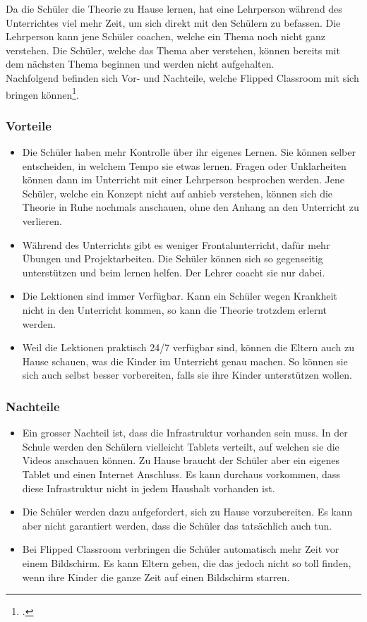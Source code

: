 Da die Schüler die Theorie zu Hause lernen, hat eine Lehrperson während des Unterrichtes viel mehr Zeit, um sich direkt mit den Schülern zu befassen. Die Lehrperson kann jene Schüler coachen, welche ein Thema noch nicht ganz verstehen. Die Schüler, welche das Thema aber verstehen, können bereits mit dem nächsten Thema beginnen und werden nicht aufgehalten. \\

Nachfolgend befinden sich Vor- und Nachteile, welche Flipped Classroom mit sich bringen können\footcite{flipped_classroom_pro_con}.

\subsubsection*{Vorteile}
\begin{itemize}
	\item Die Schüler haben mehr Kontrolle über ihr eigenes Lernen. Sie können selber entscheiden, in welchem Tempo sie etwas lernen. Fragen oder Unklarheiten können dann im Unterricht mit einer Lehrperson besprochen werden. Jene Schüler, welche ein Konzept nicht auf anhieb verstehen, können sich die Theorie in Ruhe nochmals anschauen, ohne den Anhang an den Unterricht zu verlieren.
	\item Während des Unterrichts gibt es weniger Frontalunterricht, dafür mehr Übungen und Projektarbeiten. Die Schüler können sich so gegenseitig unterstützen und beim lernen helfen. Der Lehrer coacht sie nur dabei.
	\item Die Lektionen sind immer Verfügbar. Kann ein Schüler wegen Krankheit nicht in den Unterricht kommen, so kann die Theorie trotzdem erlernt werden. 
	\item Weil die Lektionen praktisch 24/7 verfügbar sind, können die Eltern auch zu Hause schauen, was die Kinder im Unterricht genau machen. So können sie sich auch selbst besser vorbereiten, falls sie ihre Kinder unterstützen wollen. 
\end{itemize}

\subsubsection*{Nachteile}
\begin{itemize}
	\item Ein grosser Nachteil ist, dass die Infrastruktur vorhanden sein muss. In der Schule werden den Schülern vielleicht Tablets verteilt, auf welchen sie die Videos anschauen können. Zu Hause braucht der Schüler aber ein eigenes Tablet und einen Internet Anschluss. Es kann durchaus vorkommen, dass diese Infrastruktur nicht in jedem Haushalt vorhanden ist.
	\item Die Schüler werden dazu aufgefordert, sich zu Hause vorzubereiten. Es kann aber nicht garantiert werden, dass die Schüler das tatsächlich auch tun.
	\item Bei Flipped Classroom verbringen die Schüler automatisch mehr Zeit vor einem Bildschirm. Es kann Eltern geben, die das jedoch nicht so toll finden, wenn ihre Kinder die ganze Zeit auf einen Bildschirm starren.
\end{itemize}

